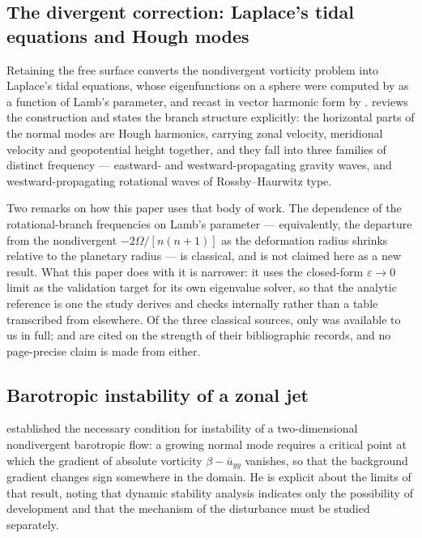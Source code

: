 \subsection{The divergent correction: Laplace's tidal equations and Hough modes}

Retaining the free surface converts the nondivergent vorticity problem into
Laplace's tidal equations, whose eigenfunctions on a sphere were computed by
\citet{longuethiggins1968} as a function of Lamb's parameter, and recast in vector
harmonic form by \citet{swarztrauber1985}. \citet{kasahara1976} reviews the
construction and states the branch structure explicitly: the horizontal parts of
the normal modes are Hough harmonics, carrying zonal velocity, meridional velocity
and geopotential height together, and they fall into three families of distinct
frequency --- eastward- and westward-propagating gravity waves, and
westward-propagating rotational waves of Rossby--Haurwitz type.

Two remarks on how this paper uses that body of work. The dependence of the
rotational-branch frequencies on Lamb's parameter --- equivalently, the departure
from the nondivergent $-2\Omega/[n(n+1)]$ as the deformation radius shrinks
relative to the planetary radius --- is classical, and is not claimed here as a new
result. What this paper does with it is narrower: it uses the closed-form
$\varepsilon \to 0$ limit as the validation target for its own eigenvalue solver,
so that the analytic reference is one the study derives and checks internally
rather than a table transcribed from elsewhere. Of the three classical sources,
only \citet{kasahara1976} was available to us in full; \citet{longuethiggins1968}
and \citet{swarztrauber1985} are cited on the strength of their bibliographic
records, and no page-precise claim is made from either.

\subsection{Barotropic instability of a zonal jet}

\citet{kuo1949} established the necessary condition for instability of a
two-dimensional nondivergent barotropic flow: a growing normal mode requires a
critical point at which the gradient of absolute vorticity $\beta - \bar u_{yy}$
vanishes, so that the background gradient changes sign somewhere in the domain. He
is explicit about the limits of that result, noting that dynamic stability analysis
indicates only the possibility of development and that the mechanism of the
disturbance must be studied separately.

